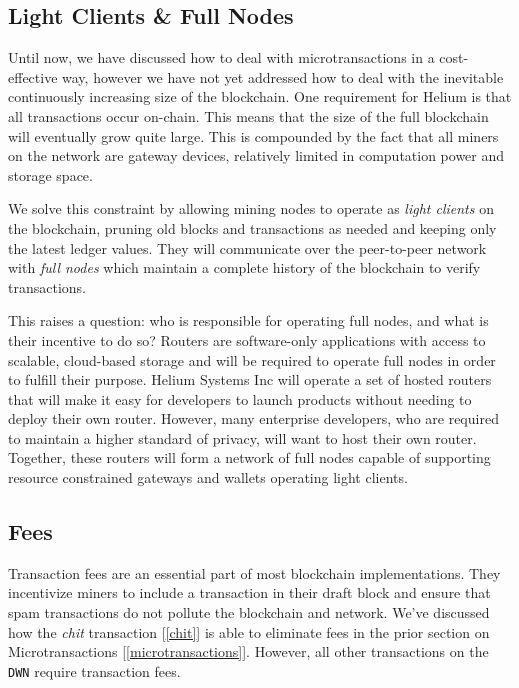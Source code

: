 \documentclass[letterpaper,11pt]{article}
\begin{document}
\subsection{Light Clients \& Full Nodes} \label{full-nodes}

Until now, we have discussed how to deal with microtransactions in a cost-effective way, however we have not yet addressed how to deal with the inevitable continuously increasing size of the blockchain. One requirement for Helium is that all transactions occur on-chain. This means that the size of the full blockchain will eventually grow quite large. This is compounded by the fact that all miners on the network are gateway devices, relatively limited in computation power and storage space.

We solve this constraint by allowing mining nodes to operate as \emph{light clients} on the blockchain, pruning old blocks and transactions as needed and keeping only the latest ledger values. They will communicate over the peer-to-peer network with \emph{full nodes} which maintain a complete history of the blockchain to verify transactions.

This raises a question: who is responsible for operating full nodes, and what is their incentive to do so? Routers are software-only applications with access to scalable, cloud-based storage and will be required to operate full nodes in order to fulfill their purpose. Helium Systems Inc will operate a set of hosted routers that will make it easy for developers to launch products without needing to deploy their own router. However, many enterprise developers, who are required to maintain a higher standard of privacy, will want to host their own router. Together, these routers will form a network of full nodes capable of supporting resource constrained gateways and wallets operating light clients.

\subsection{Fees} \label{fees}

Transaction fees are an essential part of most blockchain implementations. They incentivize miners to include a transaction in their draft block and ensure that spam transactions do not pollute the blockchain and network. We've discussed how the \emph{chit} transaction [\ref{chit}] is able to eliminate fees in the prior section on Microtransactions [\ref{microtransactions}]. However, all other transactions on the \verb|DWN| require transaction fees.
\end{document}
